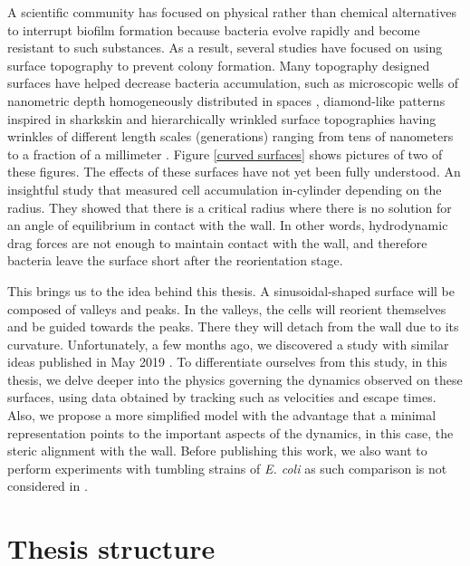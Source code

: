 A scientific community has focused on physical rather than chemical alternatives to interrupt biofilm formation because bacteria evolve rapidly and become resistant to such substances. As a result, several studies have focused on using surface topography to prevent colony formation. Many topography designed surfaces have helped decrease bacteria accumulation, such as microscopic wells of nanometric depth homogeneously distributed in spaces \cite{Perera-Costa2014StudyingPatterns}, diamond-like patterns inspired in sharkskin \cite{Reddy2011MicropatternedColi} and hierarchically wrinkled surface topographies having wrinkles of different length scales (generations) ranging from tens of nanometers to a fraction of a millimeter \cite{Efimenko2009DevelopmentAntifouling}. Figure \ref{curved surfaces} shows pictures of two of these figures. The effects of these surfaces have not yet been fully understood. An insightful study that measured cell accumulation in-cylinder depending on the radius. They showed that there is a critical radius where there is no solution for an angle of equilibrium in contact with the wall. In other words, hydrodynamic drag forces are not enough to maintain contact with the wall, and therefore bacteria leave the surface \cite{Sipos2015HydrodynamicWalls} short after the reorientation stage. 

This brings us to the idea behind this thesis. A sinusoidal-shaped surface will be composed of valleys and peaks. In the valleys, the cells will reorient themselves and be guided towards the peaks. There they will detach from the wall due to its curvature. Unfortunately, a few months ago, we discovered a study with similar ideas published in May 2019 \cite{Mok2019GeometricAccumulation}. To differentiate ourselves from this study, in this thesis, we delve deeper into the physics governing the dynamics observed on these surfaces, using data obtained by tracking such as velocities and escape times. Also, we propose a more simplified model with the advantage that a minimal representation points to the important aspects of the dynamics, in this case, the steric alignment with the wall. Before publishing this work, we also want to perform experiments with tumbling strains of \textit{E. coli} as such comparison is not considered in \cite{Mok2019GeometricAccumulation}.

\section{Thesis structure}

